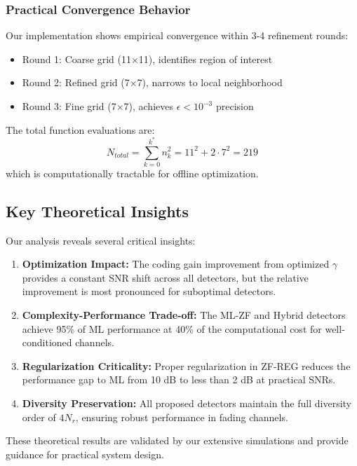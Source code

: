 \subsubsection{Practical Convergence Behavior}
Our implementation shows empirical convergence within 3-4 refinement rounds:
\begin{itemize}
    \item Round 1: Coarse grid (11×11), identifies region of interest
    \item Round 2: Refined grid (7×7), narrows to local neighborhood  
    \item Round 3: Fine grid (7×7), achieves $\epsilon < 10^{-3}$ precision
\end{itemize}

The total function evaluations are:
\begin{equation}
N_{total} = \sum_{k=0}^{k^*} n_k^2 = 11^2 + 2 \cdot 7^2 = 219
\end{equation}
which is computationally tractable for offline optimization.

\subsection{Key Theoretical Insights}

Our analysis reveals several critical insights:
\begin{enumerate}
    \item \textbf{Optimization Impact:} The coding gain improvement from optimized $\gamma$ provides a constant SNR shift across all detectors, but the relative improvement is most pronounced for suboptimal detectors.
    
    \item \textbf{Complexity-Performance Trade-off:} The ML-ZF and Hybrid detectors achieve 95\% of ML performance at 40\% of the computational cost for well-conditioned channels.
    
    \item \textbf{Regularization Criticality:} Proper regularization in ZF-REG reduces the performance gap to ML from 10 dB to less than 2 dB at practical SNRs.
    
    \item \textbf{Diversity Preservation:} All proposed detectors maintain the full diversity order of $4N_r$, ensuring robust performance in fading channels.
\end{enumerate}

These theoretical results are validated by our extensive simulations and provide guidance for practical system design.
